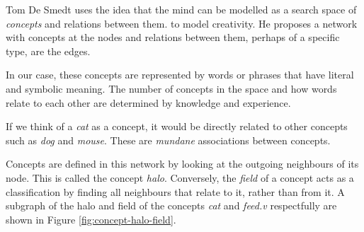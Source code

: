Tom De Smedt uses the idea that the mind can be modelled as a search space of \textit{concepts} and relations between them. to model creativity\cite{creativitynetwork}. He proposes a network with concepts at the nodes and relations between them, perhaps of a specific type, are the edges.

In our case, these concepts are represented by words or phrases that have literal and symbolic meaning. The number of concepts in the space and how words relate to each other are determined by knowledge and experience.

If we think of a \textit{cat} as a concept, it would be directly related to other concepts such as \textit{dog} and \textit{mouse}. These are \textit{mundane} associations between concepts.

Concepts are defined in this network by looking at the outgoing neighbours of its node. This is called the concept \textit{halo}. Conversely, the \textit{field} of a concept acts as a classification by finding all neighbours that relate to it, rather than from it. A subgraph of the halo and field of the concepts \textit{cat} and \textit{feed.v} respectfully are shown in Figure \ref{fig:concept-halo-field}.

